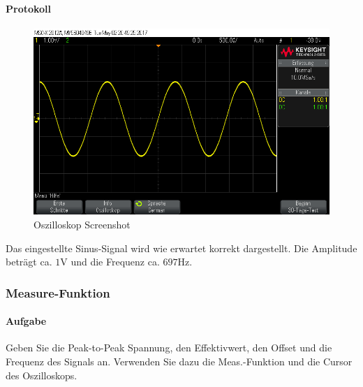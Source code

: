 \documentclass[10pt]{report}
\begin{document}
        \paragraph{Protokoll}
        \begin{center}
            \begin{figure}[H]
                \includegraphics[width=\textwidth]{scope_14.png}
              \caption{Oszilloskop Screenshot}
            \end{figure}
        \end{center}
        Das eingestellte Sinus-Signal wird wie erwartet korrekt dargestellt. Die Amplitude
        beträgt ca. $1\si{\volt}$ und die Frequenz ca. $697\si{\hertz}$.
        \subsubsection{Measure-Funktion}
        \paragraph{Aufgabe}
        Geben Sie die Peak-to-Peak Spannung, den Effektivwert, den Offset und die Frequenz
        des Signals an. Verwenden Sie dazu die \glqq{}Meas.\grqq-{}Funktion und die Cursor des
        Oszilloskops.
\end{document}
